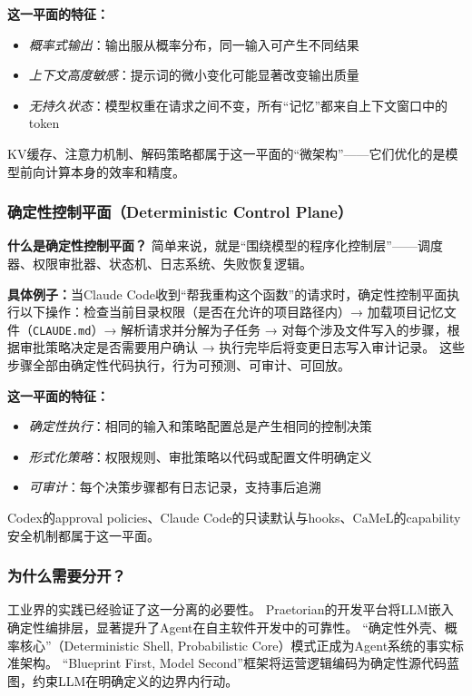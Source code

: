 \textbf{这一平面的特征：}
\begin{itemize}[nosep]
\item \textit{概率式输出}：输出服从概率分布，同一输入可产生不同结果
\item \textit{上下文高度敏感}：提示词的微小变化可能显著改变输出质量
\item \textit{无持久状态}：模型权重在请求之间不变，所有``记忆''都来自上下文窗口中的token
\end{itemize}

KV缓存、注意力机制、解码策略都属于这一平面的``微架构''——它们优化的是模型前向计算本身的效率和精度。

\subsubsection{确定性控制平面（Deterministic Control Plane）}

\textbf{什么是确定性控制平面？}
简单来说，就是``围绕模型的程序化控制层''——调度器、权限审批器、状态机、日志系统、失败恢复逻辑。

\textbf{具体例子：}当Claude Code收到``帮我重构这个函数''的请求时，确定性控制平面执行以下操作：检查当前目录权限（是否在允许的项目路径内）→ 加载项目记忆文件（\texttt{CLAUDE.md}）→ 解析请求并分解为子任务 → 对每个涉及文件写入的步骤，根据审批策略决定是否需要用户确认 → 执行完毕后将变更日志写入审计记录\cite{anthropic_claudecode_security_2026}。
这些步骤全部由确定性代码执行，行为可预测、可审计、可回放。

\textbf{这一平面的特征：}
\begin{itemize}[nosep]
\item \textit{确定性执行}：相同的输入和策略配置总是产生相同的控制决策
\item \textit{形式化策略}：权限规则、审批策略以代码或配置文件明确定义
\item \textit{可审计}：每个决策步骤都有日志记录，支持事后追溯
\end{itemize}

Codex的approval policies\cite{openai_codex_approvals_2026}、Claude Code的只读默认与hooks\cite{anthropic_claudecode_security_2026}、CaMeL的capability安全机制\cite{debenedetti2025camel}都属于这一平面。

\subsubsection{为什么需要分开？}

工业界的实践已经验证了这一分离的必要性。
Praetorian的开发平台将LLM嵌入确定性编排层，显著提升了Agent在自主软件开发中的可靠性\cite{praetorian2025deterministic}。
``确定性外壳、概率核心''（Deterministic Shell, Probabilistic Core）模式正成为Agent系统的事实标准架构\cite{towardsai2025deterministicshell}。
``Blueprint First, Model Second''框架将运营逻辑编码为确定性源代码蓝图，约束LLM在明确定义的边界内行动\cite{blueprintfirst2025}。

